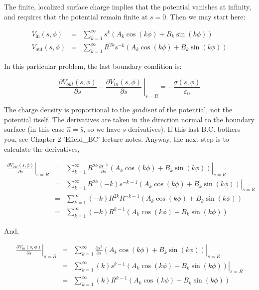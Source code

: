 \documentclass[12pt]{article}
\begin{document}
\begin{flushleft}
The finite, localized surface charge implies that the potential vanishes at infinity, and requires that the potential remain finite at $s=0$.  Then we may start here:

\begin{eqnarray*}
V_{\text{in}}(s,\phi) & = & \sum_{k=1}^{\infty}  s^{k} ( A_{k} \cos{(k\phi)}+B_{k}\sin{(k\phi)} ) \\[4pt]
V_{\text{out}}(s,\phi) &  = & \sum_{k=1}^{\infty} R^{2k}  s^{-k} ( A_{k} \cos{(k\phi)}+B_{k}\sin{(k\phi)} )
\end{eqnarray*}

In this particular problem, the last boundary condition is:

\begin{equation}
\left. \frac{\partial V_{out}(s,\phi)}{\partial s} - \frac{\partial V_{in}(s,\phi)}{\partial s} \: \right\vert_{s=R}= -\frac{\sigma(s,\phi) }{\varepsilon_{0}}
\label{eq:lastbc}
\end{equation}

The charge density is proportional to the \textit{gradient} of the potential, not the potential itself.  The derivatives are taken in the direction normal to the boundary surface (in this case $\hat{n}=\hat{s}$, so we have $s$ derivatives).  If this last B.C. bothers you, see Chapter 2 'Efield\_BC' lecture notes.  Anyway, the next step is to calculate the derivatives,

\begin{eqnarray*}
 \left. \frac{\partial V_{out}(s,\phi)}{\partial s} \right|_{s=R} & = & 
 \left. \sum_{k=1}^{\infty} R^{2k}  \frac{\partial s^{-k}}{\partial s} ( A_{k} \cos{(k\phi)}+B_{k}\sin{(k\phi)} ) \right|_{s=R}\\[4pt]
& =  & \left. \sum_{k=1}^{\infty} R^{2k} (-k) s^{-k-1} ( A_{k} \cos{(k\phi)}+B_{k}\sin{(k\phi)} ) \right|_{s=R} \\[4pt]
& = &  \sum_{k=1}^{\infty} (-k) R^{2k} R^{-k-1} ( A_{k} \cos{(k\phi)}+B_{k}\sin{(k\phi)} ) \\[4pt]
& = & \sum_{k=1}^{\infty} (-k) R^{k-1} ( A_{k} \cos{(k\phi)}+B_{k}\sin{(k\phi)} )
\end{eqnarray*}

And, 

\begin{eqnarray*}
 \left. \frac{\partial V_{in}(s,\phi)}{\partial s} \right|_{s=R} & = & 
\left. \sum_{k=1}^{\infty}  \frac{\partial s^{k}}{\partial s} ( A_{k} \cos{(k\phi)}+B_{k}\sin{(k\phi)} )  \right|_{s=R} \\[4pt]
& =  & \left. \sum_{k=1}^{\infty}  (k) s^{k-1} ( A_{k} \cos{(k\phi)}+B_{k}\sin{(k\phi)} )  \right|_{s=R} \\[4pt]
& = & \sum_{k=1}^{\infty}  (k) R^{k-1} ( A_{k} \cos{(k\phi)}+B_{k}\sin{(k\phi)} ) 
\end{eqnarray*}


\end{flushleft}
\end{document}
